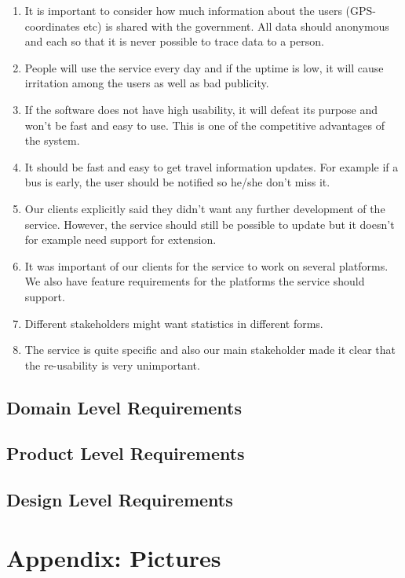 \documentclass[a4paper]{article}
\begin{document}
		\begin{enumerate}
  			\item It is important to consider how much information about the users (GPS-coordinates etc) is shared with the government.	All data should anonymous and each so that it is never possible to trace data to a person.
  			\item People will use the service every day and if the uptime is low, it will cause irritation among the users as well as bad publicity.
  			\item If the software does not have high usability, it will defeat its purpose and won't be fast and easy to use. This is one of the competitive advantages of the system.
  			\item It should be fast and easy to get travel information updates. For example if a bus is early, the user should be notified so he/she don't miss it.
  			\item Our clients explicitly said they didn't want any further development of the service. However, the service should still be possible to update but it doesn't for example need support for extension.
  			\item It was important of our clients for the service to work on several platforms. We also have feature requirements for the platforms the service should support.
  			\item Different stakeholders might want statistics in different forms.
  			\item The service is quite specific and also our main stakeholder made it clear that the re-usability is very unimportant.	
		\end{enumerate}



		\subsection{Domain Level Requirements}
		
			
		
		\subsection{Product Level Requirements}
					
		\subsection{Design Level Requirements}	
	
	\section{Appendix: Pictures} %
		\label{sec:appendix}
		
\end{document}

